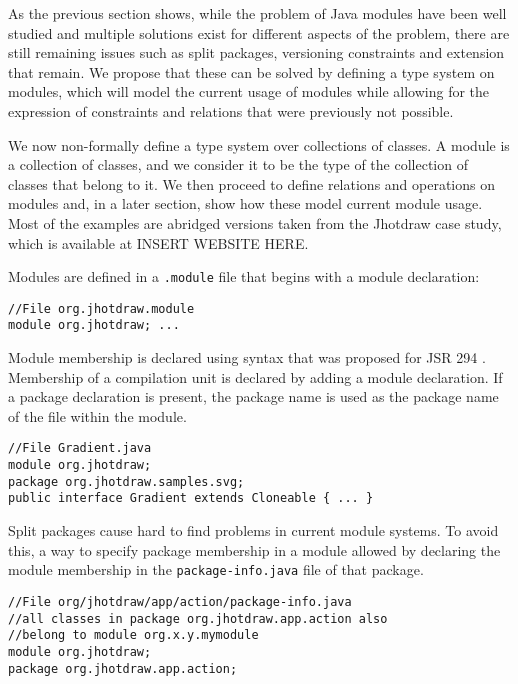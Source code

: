 
As the previous section shows, while the problem of Java modules have been
well studied and multiple solutions exist for different aspects of the problem,
there are still remaining issues such as split packages, versioning constraints 
and extension that remain. We propose that these can be solved by
defining a type system on modules, which will model the current usage
of modules while allowing for the expression of constraints and relations
that were previously not possible.

We now non-formally define a type system over collections of classes. 
A module is a collection of classes, and we consider it to be the type of 
the collection of classes that belong to it. We then proceed to define
relations and operations on modules and, in a later section, show how
these model current module usage. Most of the examples are abridged versions 
taken from the Jhotdraw case study, which is available at INSERT WEBSITE HERE.


Modules are defined in a {\tt .module} file that begins with a module
declaration:

\begin{lstlisting}
//File org.jhotdraw.module
module org.jhotdraw; ...
\end{lstlisting}

Module membership is declared using syntax that was proposed 
for JSR 294 \cite{superpackageChange}. Membership of a compilation unit is 
declared by adding a module declaration. If a package declaration is present, 
the package name is used as the package name of the file within the module.

\begin{lstlisting}
//File Gradient.java
module org.jhotdraw;
package org.jhotdraw.samples.svg;
public interface Gradient extends Cloneable { ... }
\end{lstlisting}

Split packages cause hard to find problems in current module systems\cite{iJAMComments}. To avoid this, 
a way to specify package membership in a module allowed by declaring the module membership
in the {\tt package-info.java} file of that package.

\begin{lstlisting}
//File org/jhotdraw/app/action/package-info.java
//all classes in package org.jhotdraw.app.action also
//belong to module org.x.y.mymodule
module org.jhotdraw;
package org.jhotdraw.app.action;
\end{lstlisting}

